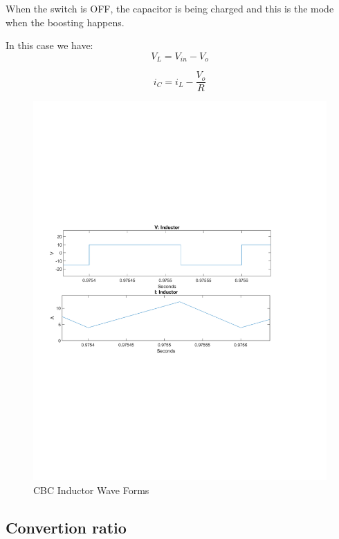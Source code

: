 When the switch is OFF,
the capacitor is being charged and this is the mode when the boosting happens.

In this case we have:
\begin{equation}
	V_L = V_{in} - V_o
	\label{eq:pumpHeadModel}
\end{equation}

\begin{equation}
	i_C = i_L -\frac{V_o}{R}
	\label{eq:pumpHeadModel}
\end{equation}

\begin{figure}[H]
   \centering
   \includegraphics[width=\textwidth]{figures/aConventionalBoost/LvAndLi.pdf}
    \caption{CBC Inductor Wave Forms}
	\label{fig:ConventionalBoostOFF}
\end{figure}

\subsection{Convertion ratio}\label{sec:SON}

